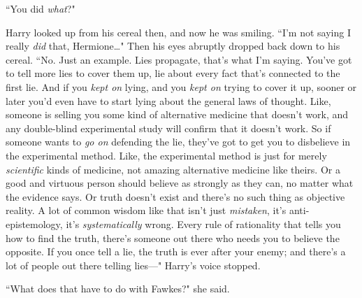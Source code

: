 ``You did \emph{what}?"

Harry looked up from his cereal then, and now he was smiling. ``I'm not saying I really \emph{did} that, Hermione{\ldots}" Then his eyes abruptly dropped back down to his cereal. ``No. Just an example. Lies propagate, that's what I'm saying. You've got to tell more lies to cover them up, lie about every fact that's connected to the first lie. And if you \emph{kept on} lying, and you \emph{kept on} trying to cover it up, sooner or later you'd even have to start lying about the general laws of thought. Like, someone is selling you some kind of alternative medicine that doesn't work, and any double-blind experimental study will confirm that it doesn't work. So if someone wants to \emph{go on} defending the lie, they've got to get you to disbelieve in the experimental method. Like, the experimental method is just for merely \emph{scientific} kinds of medicine, not amazing alternative medicine like theirs. Or a good and virtuous person should believe as strongly as they can, no matter what the evidence says. Or truth doesn't exist and there's no such thing as objective reality. A lot of common wisdom like that isn't just \emph{mistaken}, it's anti-epistemology, it's \emph{systematically} wrong. Every rule of rationality that tells you how to find the truth, there's someone out there who needs you to believe the opposite. If you once tell a lie, the truth is ever after your enemy; and there's a lot of people out there telling lies---" Harry's voice stopped.

``What does that have to do with Fawkes?" she said.

